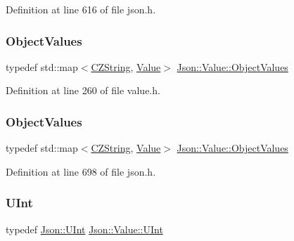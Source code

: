 Definition at line 616 of file json.\+h.

\hypertarget{class_json_1_1_value_a08b6c80c3af7071d908dabf044de5388}{}\label{class_json_1_1_value_a08b6c80c3af7071d908dabf044de5388} 
\subsubsection{\texorpdfstring{Object\+Values}{ObjectValues}\hspace{0.1cm}{\footnotesize\ttfamily [1/2]}}
{\footnotesize\ttfamily typedef std\+::map$<$\hyperlink{class_json_1_1_value_1_1_c_z_string}{C\+Z\+String}, \hyperlink{class_json_1_1_value}{Value}$>$ \hyperlink{class_json_1_1_value_a08b6c80c3af7071d908dabf044de5388}{Json\+::\+Value\+::\+Object\+Values}}



Definition at line 260 of file value.\+h.

\hypertarget{class_json_1_1_value_a08b6c80c3af7071d908dabf044de5388}{}\label{class_json_1_1_value_a08b6c80c3af7071d908dabf044de5388} 
\subsubsection{\texorpdfstring{Object\+Values}{ObjectValues}\hspace{0.1cm}{\footnotesize\ttfamily [2/2]}}
{\footnotesize\ttfamily typedef std\+::map$<$\hyperlink{class_json_1_1_value_1_1_c_z_string}{C\+Z\+String}, \hyperlink{class_json_1_1_value}{Value}$>$ \hyperlink{class_json_1_1_value_a08b6c80c3af7071d908dabf044de5388}{Json\+::\+Value\+::\+Object\+Values}}



Definition at line 698 of file json.\+h.

\hypertarget{class_json_1_1_value_a0933d59b45793ae4aade1757c322a98d}{}\label{class_json_1_1_value_a0933d59b45793ae4aade1757c322a98d} 
\subsubsection{\texorpdfstring{U\+Int}{UInt}\hspace{0.1cm}{\footnotesize\ttfamily [1/2]}}
{\footnotesize\ttfamily typedef \hyperlink{namespace_json_a800fb90eb6ee8d5d62b600c06f87f7d4}{Json\+::\+U\+Int} \hyperlink{class_json_1_1_value_a0933d59b45793ae4aade1757c322a98d}{Json\+::\+Value\+::\+U\+Int}}



